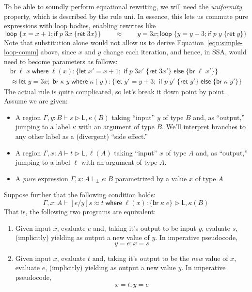 \documentclass[acmsmall,screen,review]{acmart}
\newcommand{\ms}[1]{\ensuremath{\mathsf{#1}}}
\newcommand{\lto}{:}
\newcommand{\letexpr}[3]{\ensuremath{\ms{let}\;#1 = #2;\;#3}}
\newcommand{\brb}[2]{\ms{br}\;#1\;#2}
\newcommand{\where}[2]{#1\;\ms{where}\;#2}
\newcommand{\wbranch}[3]{#1(#2) \lto \{#3\}}
\newcommand{\bhyp}[2]{#1 : #2}
\newcommand{\hasty}[4]{#1 \vdash_{#2} #3: {#4}}
\newcommand{\haslb}[3]{#1 \vdash #2 \rhd #3}
\newcommand{\teqv}{\approx}
\newcommand{\lbeq}[4]{#1 \vdash #2 \teqv #3 \rhd {#4}}
\newcommand{\brle}[1]{{\textsf{#1}}}
\begin{document}
To be able to soundly perform equational rewriting, we will need the \emph{uniformity} property,
which is described by the rule \brle{uni}. In essence, this lets us commute pure expressions with
loop bodies, enabling rewrites like
\begin{equation}
  \ms{loop}\;\{ x = x + 1; \ms{if}\;p\;3x\;\{\ms{ret}\;3x\} \}
  \qquad \teqv \qquad 
  y = 3x; \ms{loop}\;\{ y = y + 3; \ms{if}\;p\;y\;\{\ms{ret}\;y\} \}
  \label{eqn:simple-loop-comm} 
\end{equation}
Note that substitution alone would not allow us to derive Equation~\ref{eqn:simple-loop-comm} above,
since $x$ and $y$ change each iteration, and hence, in SSA, would need to become parameters as
follows:
\begin{multline}
  \where{\brb{\ell}{x}}{\wbranch{\ell}{x}
    {\letexpr{x'}{x + 1}{\ms{if}\;p\;3x'\;\{\ms{ret}\;3x'\}\;\ms{else}\;\{\brb{\ell}{x'}\}}}}
  \\ \teqv
  \where{\letexpr{y}{3x}{\brb{\kappa}{y}}}{\wbranch{\kappa}{y}
    {\letexpr{y'}{y + 3}{\ms{if}\;p\;y'\;\{\ms{ret}\;y'\}\;\ms{else}\;\{\brb{\kappa}{y'}\}}}}
\end{multline}
The actual rule is quite complicated, so let's break it down point by point. Assume we are given:
\begin{itemize}
  \item A region $\haslb{\Gamma, \bhyp{y}{B}}{s}{\ms{L}, \kappa(B)}$ taking ``input'' $y$ of type
    $B$ and, as ``output,'' jumping to a label $\kappa$ with an argument of type $B$. We'll
    interpret branches to any other label as a (divergent) ``side effect.''
  \item A region $\haslb{\Gamma, \bhyp{x}{A}}{t}{\ms{L}, \ell(A)}$ taking ``input'' $x$ of type
    $A$ and, as ``output,'' jumping to a label $\ell$ with an argument of type $A$.
  \item A \emph{pure} expression $\hasty{\Gamma, \bhyp{x}{A}}{\bot}{e}{B}$ parametrized by a value
    $x$ of type $A$
\end{itemize}
Suppose further that the following condition holds:
$$
  \lbeq{\Gamma, \bhyp{x}{A}}{[e/y]s}{\where{t}{\wbranch{\ell}{x}{\brb{\kappa}{e}}}}
    {\ms{L}, \kappa(B)}
$$
That is, the following two programs are equivalent:
\begin{enumerate}[label=(\alph*)]
  \item Given input $x$, evaluate $e$ and, taking it's output to be input $y$, evaluate $s$,
  (implicitly) yielding as output a new value of $y$. In imperative pseudocode,
  $$
    y = e; x = s
  $$
  \item Given input $x$, evaluate $t$ and, taking it's output to be the \emph{new} value of $x$,
  evaluate $e$, (implicitly) yielding as output a new value $y$. In imperative pseudocode,
  $$
    x = t; y = e
  $$
\end{enumerate}
\end{document}
